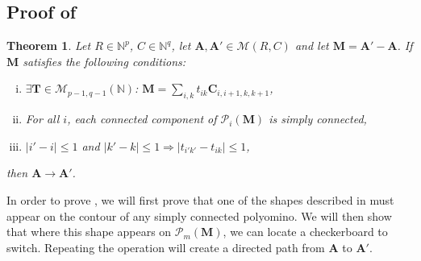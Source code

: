 \documentclass{article}
\newtheorem*{theorem*}{Theorem}
\newcommand{\N}{\mathbb{N}}
\newcommand{\MM}{\mathcal M}
\renewcommand{\P}{\mathcal P}
\newcommand{\rar}{\rightarrow}
\newcommand{\imp}{\Rightarrow}
\newcommand{\A}{\mathbf A}
\newcommand{\C}{\mathbf C}
\newcommand{\M}{\mathbf M}
\newcommand{\T}{\mathbf T}
\begin{document}
\subsection{Proof of }

\begin{theorem*}
Let $R\in \N^p$, $C\in \N^q$, let $\A,\A' \in \MM(R,C)$ and let $\M=\A'-\A$. If $\M$ satisfies the following conditions:
\begin{enumerate}[(i)]
    \item $\exists \T\in \MM_{p-1,q-1}(\N)$: $\M=\sum_{i,k} t_{ik}\C_{i,i+1,k,k+1}$,
    \item For all $i$, each connected component of $\P_i(\M)$ is simply connected,
    \item $|i'-i|\leq 1$ and $|k'-k|\leq 1 \imp |t_{i'k'}-t_{ik}|\leq 1$,
\end{enumerate}
then $\A\rar \A'$.
\end{theorem*}


In order to prove , we will first prove that one of the shapes described in  must appear on the contour of any simply connected polyomino. We will then show that where this shape appears on $\P_m(\M)$, we can locate a checkerboard to switch. Repeating the operation will create a directed path from $\A$ to $\A'$.
\end{document}
